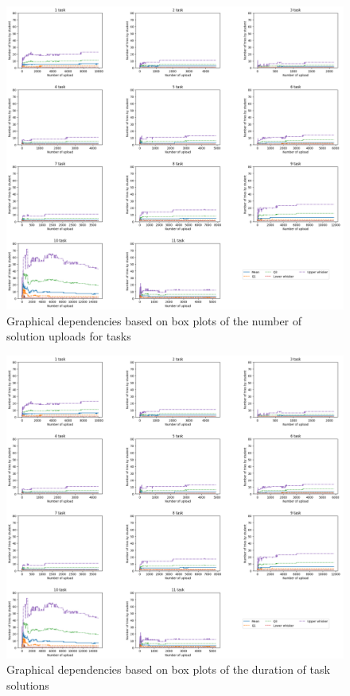 \documentclass[letterpaper]{article}
\begin{document}
  \begin{figure}[h]
    \centering
    \includegraphics[width=\linewidth]{pic1.png}
    \caption{Graphical dependencies based on box plots of the number of solution uploads for tasks}
  \end{figure}
  \begin{figure}[h]
    \centering
    \includegraphics[width=\linewidth]{pic1.png}
    \caption{Graphical dependencies based on box plots of the duration of task solutions}
    \label{Fig:text}
  \end{figure}
\end{document}

